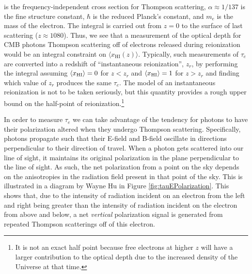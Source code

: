 is the frequency-independent cross section for Thompson scattering, $\alpha \approx 1/137$ is the fine structure constant, $\hbar$ is the reduced Planck's constant, and $m_e$ is the mass of the electron. The integral is carried out from $z = 0$ to the surface of last scattering ($z \approx 1080$). Thus, we see that a measurement of the optical depth for CMB photons Thompson scattering off of electrons released during reionization would be an integral constraint on $\langle x_{\text{HI}}(z)\rangle$. Typically, such measurements of $\tau_{e}$ are converted into a redshift of ``instantaneous reionization'', $z_{r}$, by performing the integral assuming $\langle x_{\text{HI}}\rangle = 0$ for $z < z_{r}$ and $\langle x_{\text{HI}}\rangle = 1$ for $z > z_r$ and finding which value of $z_{r}$ produces the same $\tau_{e}$. The model of an instantaneous reionization is not to be taken seriously, but this quantity provides a rough upper bound on the half-point of reionization.\footnote{It is not an exact half point because free electrons at higher $z$ will have a larger contribution to the optical depth due to the increased density of the Universe at that time.} 


In order to measure $\tau_{e}$ we can take advantage of the tendency for photons to have their polarization altered when they undergo Thompson scattering. Specifically, photons propagate such that their E-field and B-field oscillate in directions perpendicular to their direction of travel. When a photon gets scattered into our line of sight, it maintains its original polarization in the plane perpendicular to the line of sight. As such, the net polarization from a point on the sky depends on the anisotropies in the radiation field present in that point of the sky. This is illustrated in a diagram by Wayne Hu in Figure \ref{fig:tauEPolarization}. This shows that, due to the intensity of radiation incident on an electron from the left and right being greater than the intensity of radiation incident on the electron from above and below, a net \textit{vertical} polarization signal is generated from repeated Thompson scatterings off of this electron. 


